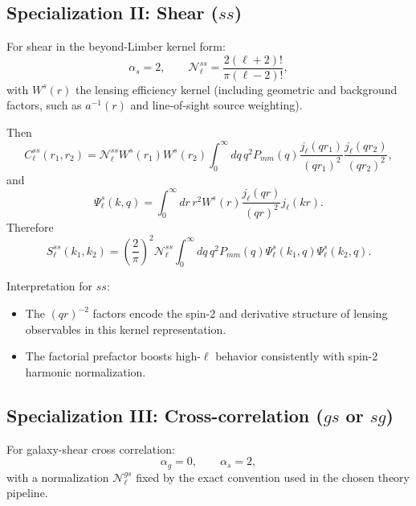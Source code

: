 \subsection{Specialization II: Shear ($ss$)}

For shear in the beyond-Limber kernel form:
\begin{equation}
\alpha_s=2,
\qquad
\mathcal N_\ell^{ss}=\frac{2(\ell+2)!}{\pi(\ell-2)!},
\end{equation}
with $W^s(r)$ the lensing efficiency kernel (including geometric and background
factors, such as $a^{-1}(r)$ and line-of-sight source weighting).

Then
\begin{equation}
C_\ell^{ss}(r_1,r_2)
=\mathcal N_\ell^{ss}W^s(r_1)W^s(r_2)
\int_0^{\infty}dq\,q^2P_{mm}(q)
\frac{j_\ell(qr_1)}{(qr_1)^2}
\frac{j_\ell(qr_2)}{(qr_2)^2},
\end{equation}
and
\begin{equation}
\Psi_\ell^s(k,q)=\int_0^{\infty}dr\,r^2W^s(r)
\frac{j_\ell(qr)}{(qr)^2}j_\ell(kr).
\end{equation}
Therefore
\begin{equation}
S_\ell^{ss}(k_1,k_2)
=\left(\frac{2}{\pi}\right)^2\mathcal N_\ell^{ss}
\int_0^{\infty}dq\,q^2P_{mm}(q)
\Psi_\ell^s(k_1,q)\Psi_\ell^s(k_2,q).
\label{eq:sfb_ss_final}
\end{equation}

Interpretation for $ss$:
\begin{itemize}
\item The $(qr)^{-2}$ factors encode the spin-2 and derivative structure of
lensing observables in this kernel representation.
\item The factorial prefactor boosts high-$\ell$ behavior consistently with
spin-2 harmonic normalization.
\end{itemize}

\subsection{Specialization III: Cross-correlation ($gs$ or $sg$)}

For galaxy-shear cross correlation:
\begin{equation}
\alpha_g=0,
\qquad
\alpha_s=2,
\end{equation}
with a normalization $\mathcal N_\ell^{gs}$ fixed by the exact convention used
in the chosen theory pipeline.

